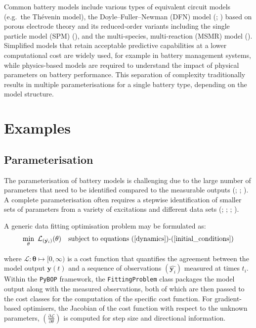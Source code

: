 \documentclass[
]{article}
\begin{document}
Common battery models include various types of equivalent circuit models
(e.g.~the Thévenin model), the Doyle--Fuller--Newman (DFN) model
(;
) based on porous
electrode theory and its reduced-order variants including the single
particle model (SPM) (), and the multi-species, multi-reaction (MSMR) model
(). Simplified
models that retain acceptable predictive capabilities at a lower
computational cost are widely used, for example in battery management
systems, while physics-based models are required to understand the
impact of physical parameters on battery performance. This separation of
complexity traditionally results in multiple parameterisations for a
single battery type, depending on the model structure.

\section{Examples}\label{examples}

\subsection{Parameterisation}\label{parameterisation}

The parameterisation of battery models is challenging due to the large
number of parameters that need to be identified compared to the
measurable outputs (; ;
). A complete
parameterisation often requires a stepwise identification of smaller
sets of parameters from a variety of excitations and different data sets
(;
; ; ).

A generic data fitting optimisation problem may be formulated as:
\begin{equation}
\min_{\mathbf{\theta}} ~ \mathcal{L}_{(\hat{\mathbf{y}_i})}(\mathbf{\theta}) ~~~
\textrm{subject to equations (\ref{dynamics})\textrm{-}(\ref{initial_conditions})}
\label{eqn:parameterisation}
\end{equation}

where \(\mathcal{L} : \mathbf{\theta} \mapsto [0,\infty)\) is a cost
function that quantifies the agreement between the model output
\(\mathbf{y}(t)\) and a sequence of observations
\((\hat{\mathbf{y}_i})\) measured at times \(t_i\). Within the
\texttt{PyBOP} framework, the \texttt{FittingProblem} class packages the
model output along with the measured observations, both of which are
then passed to the cost classes for the computation of the specific cost
function. For gradient-based optimisers, the Jacobian of the cost
function with respect to the unknown parameters,
\((\frac{\partial \mathcal{L}}{\partial \theta})\) is computed for step
size and directional information.
\end{document}
